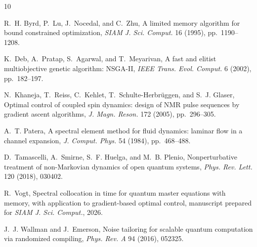 \documentclass[10pt]{article}
\begin{document}
\begin{thebibliography}{10}
\small

R.~H. Byrd, P.~Lu, J.~Nocedal, and C.~Zhu, A limited memory algorithm for
bound constrained optimization, \emph{SIAM J. Sci. Comput.} 16 (1995),
pp.~1190--1208.

K.~Deb, A.~Pratap, S.~Agarwal, and T.~Meyarivan, A fast and elitist
multiobjective genetic algorithm: NSGA-II, \emph{IEEE Trans. Evol. Comput.} 6
(2002), pp.~182--197.

N.~Khaneja, T.~Reiss, C.~Kehlet, T.~Schulte-Herbr\"uggen, and S.~J. Glaser,
Optimal control of coupled spin dynamics: design of NMR pulse sequences by
gradient ascent algorithms, \emph{J. Magn. Reson.} 172 (2005), pp.~296--305.

A.~T. Patera, A spectral element method for fluid dynamics: laminar flow in a
channel expansion, \emph{J. Comput. Phys.} 54 (1984), pp.~468--488.

D.~Tamascelli, A.~Smirne, S.~F. Huelga, and M.~B. Plenio, Nonperturbative
treatment of non-Markovian dynamics of open quantum systems, \emph{Phys. Rev.
Lett.} 120 (2018), 030402.

R.~Vogt, Spectral collocation in time for quantum master equations with memory,
with application to gradient-based optimal control, manuscript prepared for
\emph{SIAM J. Sci. Comput.}, 2026.

J.~J. Wallman and J.~Emerson, Noise tailoring for scalable quantum computation
via randomized compiling, \emph{Phys. Rev. A} 94 (2016), 052325.

\end{thebibliography}
\end{document}
